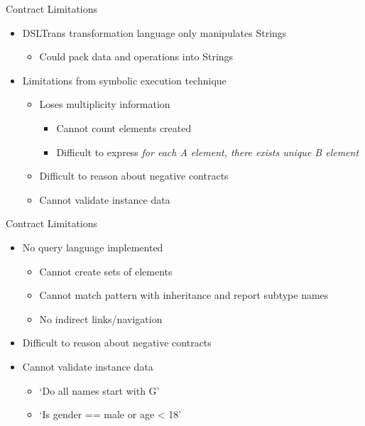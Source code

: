\documentclass[xcolor=dvipsnames, 12pt, handout]{beamer}
\begin{document}
\begin{frame}{Contract Limitations}

\begin{itemize}
\item DSLTrans transformation language only manipulates Strings
\begin{itemize}
\item Could pack data and operations into Strings
\end{itemize}
\end{itemize}

\begin{itemize}
\item Limitations from symbolic execution technique
\begin{itemize}
\item Loses multiplicity information
\begin{itemize}
\item Cannot count elements created
\item Difficult to express \textit{for each A element, there exists unique B element}
\end{itemize}
\item Difficult to reason about negative contracts
\item Cannot validate instance data
\end{itemize}
\end{itemize}

\end{frame}

\begin{frame}{Contract Limitations}

\begin{itemize}
\item No query language implemented
\begin{itemize}
\item Cannot create sets of elements
\item Cannot match pattern with inheritance and report subtype names
\item No indirect links/navigation
\end{itemize}
\item Difficult to reason about negative contracts
\item Cannot validate instance data
\begin{itemize}
\item `Do all names start with G'
\item `Is gender == male or age < 18'
\end{itemize}
\end{itemize}

\end{frame}
\end{document}
